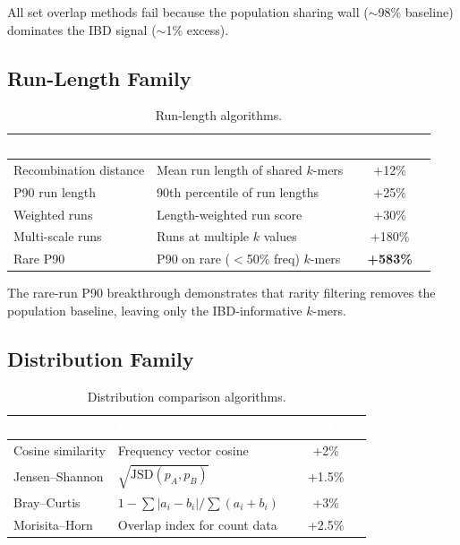 \documentclass{../yalumba}
\begin{document}
All set overlap methods fail because the population sharing wall
($\sim$98\% baseline) dominates the IBD signal ($\sim$1\% excess).

\subsection{Run-Length Family}

\begin{table}[H]
  \centering
  \tablestyle
  \caption{Run-length algorithms.}
  \label{tab:cat_run}
  \begin{tabular}{llc}
    \toprule
    \rowcolor{table-header}
    \textcolor{white}{\textbf{Algorithm}} &
    \textcolor{white}{\textbf{Description}} &
    \textcolor{white}{\textbf{CEPH Sep}} \\
    \midrule
    Recombination distance & Mean run length of shared $k$-mers & +12\% \\
    P90 run length & 90th percentile of run lengths & +25\% \\
    Weighted runs & Length-weighted run score & +30\% \\
    Multi-scale runs & Runs at multiple $k$ values & +180\% \\
    Rare P90 & P90 on rare ($<$50\% freq) $k$-mers & \textbf{+583\%} \\
    \bottomrule
  \end{tabular}
\end{table}

The rare-run P90 breakthrough demonstrates that rarity filtering
removes the population baseline, leaving only the IBD-informative
$k$-mers.

\subsection{Distribution Family}

\begin{table}[H]
  \centering
  \tablestyle
  \caption{Distribution comparison algorithms.}
  \label{tab:cat_dist}
  \begin{tabular}{llc}
    \toprule
    \rowcolor{table-header}
    \textcolor{white}{\textbf{Algorithm}} &
    \textcolor{white}{\textbf{Description}} &
    \textcolor{white}{\textbf{CEPH Sep}} \\
    \midrule
    Cosine similarity & Frequency vector cosine & +2\% \\
    Jensen--Shannon & $\sqrt{\mathrm{JSD}(p_A, p_B)}$ & +1.5\% \\
    Bray--Curtis~\cite{bray1957} & $1 - \sum|a_i - b_i| / \sum(a_i + b_i)$ & +3\% \\
    Morisita--Horn~\cite{morisita1959} & Overlap index for count data & +2.5\% \\
    \bottomrule
  \end{tabular}
\end{table}
\end{document}
